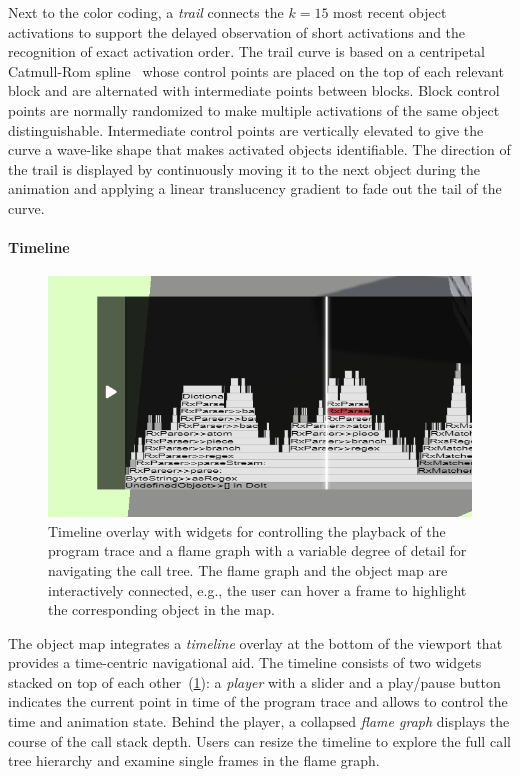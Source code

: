 Next to the color coding, a \emph{trail} connects the $k = 15$ most recent object activations to support the delayed observation of short activations and the recognition of exact activation order.
The trail curve is based on a centripetal Catmull-Rom spline~\cite{catmull1974class} whose control points are placed on the top of each relevant block and are alternated with intermediate points between blocks.
Block control points are normally randomized to make multiple activations of the same object distinguishable.
Intermediate control points are vertically elevated to give the curve a wave-like shape that makes activated objects identifiable.
The direction of the trail is displayed by continuously moving it to the next object during the animation and applying a linear translucency gradient to fade out the tail of the curve.

\paragraph{Timeline}
\label{sec:visualization_approach/mapping/timeline}

\begin{figure}
	\includegraphics[width=\linewidth]{sections/03_visualization_approach/mapping/timeline}
	\caption{
		Timeline overlay with widgets for controlling the playback of the program trace and a flame graph with a variable degree of detail for navigating the call tree.
		The flame graph and the object map are interactively connected, e.g., the user can hover a frame to highlight the corresponding object in the map.
	}
	\label{fig:visualization_approach/mapping/timeline}
\end{figure}

The object map integrates a \emph{timeline} overlay at the bottom of the viewport that provides a time-centric navigational aid.
The timeline consists of two widgets stacked on top of each other~(\cref{fig:visualization_approach/mapping/timeline}):
a \emph{player} with a slider and a play/pause button indicates the current point in time of the program trace and allows to control the time and animation state.
Behind the player, a collapsed \emph{flame graph} displays the course of the call stack depth.
Users can resize the timeline to explore the full call tree hierarchy and examine single frames in the flame graph.

